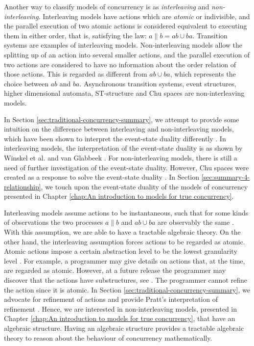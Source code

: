     Another way to classify models of concurrency is as \emph{interleaving} and \emph{non-interleaving}. Interleaving models have actions which are \emph{atomic} or indivisible, and the parallel execution of two atomic actions is considered equivalent to executing them in either order, that is, satisfying the law: $a \parallel b = ab \cup ba$. Transition systems are examples of interleaving models. Non-interleaving models allow the splitting up of an action into several smaller actions, and the parallel execution of two actions are considered to have no information about the order relation of those actions. This is regarded as different from $ab \cup ba$, which represents the choice between $ab$ and  $ba$. Asynchronous transition systems, event structures, higher dimensional automata, ST-structure and Chu spaces are non-interleaving models.
    
    In Section \ref{sec:traditional-concurrency-summary}, we attempt to provide some intuition on the difference between interleaving and non-interleaving models, which have been shown to interpret the event-state duality differently \cite{pratt91hda, Pratt02eventStateDuality}. In interleaving models, the interpretation of the event-state duality is as shown by Winskel et al. \cite{NielsenPW81eventstructures} and van Glabbeek \cite{GlabbeekP09configStruct}. For non-interleaving models, there is still a need of further investigation of the event-state duality. However, Chu spaces were created as a response to solve the event-state duality \cite{gupta94phd_Chu}. In Section \ref{sec:summary-4-relationship}, we touch upon the event-state duality of the models of concurrency presented in Chapter \ref{chap:An introduction to models for true concurrency}.
    
    Interleaving models assume actions to be instantaneous, such that for some kinds of observations the two processes $a \parallel b$ and $ab \cup ba$ are observably the same \cite{GlabbeekV97splitting}. With this assumption, we are able to have a tractable algebraic theory. On the other hand, the interleaving assumption forces actions to be regarded as atomic. Atomic actions impose a certain abstraction level to be the lowest granularity level \cite{GlabbeekG89refinement, GlabbeekG01refinement, pratt91hda}. For example, a programmer may give details on actions that, at the time, are regarded as atomic. However, at a future release the programmer may discover that the actions have substructures, see \cite[Example 1.1]{GlabbeekG89refinement}. The programmer cannot refine the action since it is atomic. In Section \ref{sec:traditional-concurrency-summary}, we advocate for refinement of actions and provide Pratt's interpretation of refinement \cite{pratt91hda}. Hence, we are interested in non-interleaving models, presented in Chapter \ref{chap:An introduction to models for true concurrency}, that have an algebraic structure. Having an algebraic structure provides a tractable algebraic theory to reason about the behaviour of concurrency mathematically.
   
